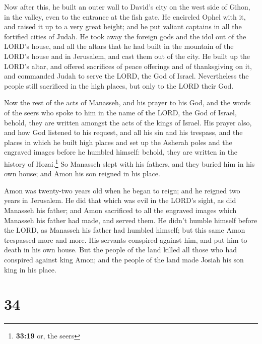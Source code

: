  Now after this, he built an outer wall to David's city
on the west side of Gihon, in the valley, even to the entrance at the
fish gate. He encircled Ophel with it, and raised it up to a very great
height; and he put valiant captains in all the fortified cities of
Judah.  He took away the foreign gods and the idol out of
the LORD's house, and all the altars that he had built in the mountain
of the LORD's house and in Jerusalem, and cast them out of the city.
 He built up the LORD's altar, and offered sacrifices of
peace offerings and of thanksgiving on it, and commanded Judah to serve
the LORD, the God of Israel.  Nevertheless the people
still sacrificed in the high places, but only to the LORD their God.

 Now the rest of the acts of Manasseh, and his prayer to
his God, and the words of the seers who spoke to him in the name of the
LORD, the God of Israel, behold, they are written amongst the acts of
the kings of Israel.  His prayer also, and how God
listened to his request, and all his sin and his trespass, and the
places in which he built high places and set up the Asherah poles and
the engraved images before he humbled himself: behold, they are written
in the history of Hozai.\footnote{\textbf{33:19} or, the seers}
 So Manasseh slept with his fathers, and they buried him
in his own house; and Amon his son reigned in his place.

 Amon was twenty-two years old when he began to reign;
and he reigned two years in Jerusalem.  He did that which
was evil in the LORD's sight, as did Manasseh his father; and Amon
sacrificed to all the engraved images which Manasseh his father had
made, and served them.  He didn't humble himself before
the LORD, as Manasseh his father had humbled himself; but this same Amon
trespassed more and more.  His servants conspired against
him, and put him to death in his own house.  But the
people of the land killed all those who had conspired against king Amon;
and the people of the land made Josiah his son king in his place.

\hypertarget{section-33}{%
\section{34}\label{section-33}}

